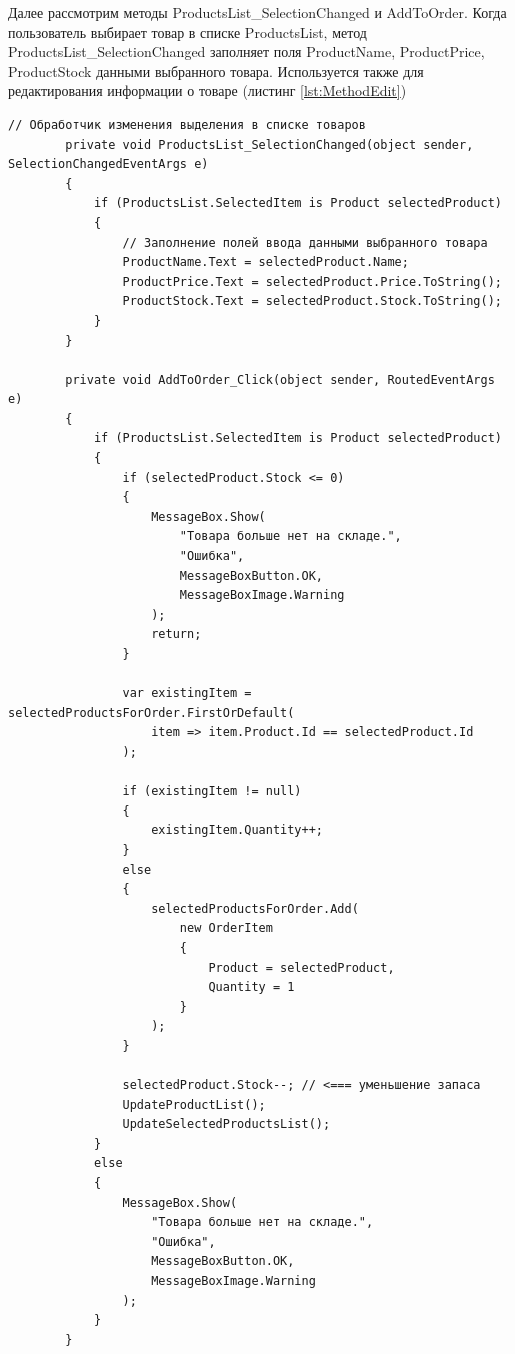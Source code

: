 \documentclass[12pt]{article}
\newcommand{\colorGIT}[1]{\textcolor{CtpGreen}{#1}}
\begin{document}
\pagebreak

Далее рассмотрим методы ProductsList\_SelectionChanged и AddToOrder. Когда пользователь выбирает товар в списке ProductsList, метод ProductsList\_SelectionChanged заполняет поля Product\-Name, ProductPrice, ProductStock данными выбранного товара. Используется также для редактирования информации о товаре (листинг \ref{lst:MethodEdit})

\begin{lstlisting}[style=csharp_catppuccin, caption=\colorGIT{\href{https://github.com/WebMasterIT/Csharp_Labs/blob/ec375afd16c0647b337cf3d8a79c8bef904fc1be/3lab/StoreManager/MainWindow.xaml.cs\#L143-L184}{Методы}} редактирования товара и добавления в список выбранных товаров для заказа, label=lst:MethodEdit]
        // Обработчик изменения выделения в списке товаров
        private void ProductsList_SelectionChanged(object sender, SelectionChangedEventArgs e)
        {
            if (ProductsList.SelectedItem is Product selectedProduct)
            {
                // Заполнение полей ввода данными выбранного товара
                ProductName.Text = selectedProduct.Name;
                ProductPrice.Text = selectedProduct.Price.ToString();
                ProductStock.Text = selectedProduct.Stock.ToString();
            }
        }

        private void AddToOrder_Click(object sender, RoutedEventArgs e)
        {
            if (ProductsList.SelectedItem is Product selectedProduct)
            {
                if (selectedProduct.Stock <= 0)
                {
                    MessageBox.Show(
                        "Товара больше нет на складе.",
                        "Ошибка",
                        MessageBoxButton.OK,
                        MessageBoxImage.Warning
                    );
                    return;
                }

                var existingItem = selectedProductsForOrder.FirstOrDefault(
                    item => item.Product.Id == selectedProduct.Id
                );

                if (existingItem != null)
                {
                    existingItem.Quantity++;
                }
                else
                {
                    selectedProductsForOrder.Add(
                        new OrderItem 
                        { 
                            Product = selectedProduct, 
                            Quantity = 1 
                        }
                    );
                }

                selectedProduct.Stock--; // <=== уменьшение запаса
                UpdateProductList();
                UpdateSelectedProductsList();
            }
            else
            {
                MessageBox.Show(
                    "Товара больше нет на складе.",
                    "Ошибка",
                    MessageBoxButton.OK,
                    MessageBoxImage.Warning
                );
            }
        }
\end{lstlisting}
\end{document}
